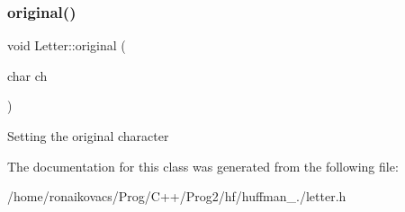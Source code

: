 \subsubsection{\texorpdfstring{original()}{original()}\hspace{0.1cm}{\footnotesize\ttfamily [2/2]}}
{\footnotesize\ttfamily void Letter\+::original (\begin{DoxyParamCaption}\item[{char}]{ch }\end{DoxyParamCaption})\hspace{0.3cm}{\ttfamily [inline]}}

Setting the original character 

The documentation for this class was generated from the following file\+:\begin{DoxyCompactItemize}
\item 
/home/ronaikovacs/\+Prog/\+C++/\+Prog2/hf/huffman\+\_./letter.\+h\end{DoxyCompactItemize}
